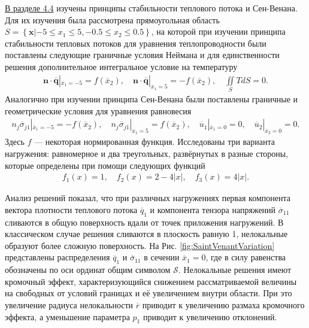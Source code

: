 \underline{В разделе 4.4} изучены принципы стабильности теплового потока и Сен-Венана. Для их изучения была рассмотрена прямоугольная область $S = \left\{ \boldsymbol{x} | -5 \leqslant x_1 \leqslant 5, -0.5 \leqslant x_2 \leqslant 0.5 \right\}$, на которой при изучении принципа стабильности тепловых потоков для уравнения теплопроводности были поставлены следующие граничные условия Неймана и для единственности решения дополнительное интегральное условие на температуру
\begin{gather*}
	\boldsymbol{n} \cdot \overline{\boldsymbol{q}} |_{\overline{x}_1 = -5} = f(\overline{x}_2),
	\quad
	\boldsymbol{n} \cdot \overline{\boldsymbol{q}} |_{\overline{x}_1 = 5} = -f(\overline{x}_2),
	\quad
	\iint\limits_S T dS = 0.
\end{gather*}
Аналогично при изучении принципа Сен-Венана были поставлены граничные и геометрические условия для уравнения равновесия
\begin{gather*}
	n_j \overline{\sigma}_{j1} |_{\overline{x}_1 = -5} = -f(\overline{x}_2),
	\quad
	n_j \overline{\sigma}_{j1} |_{\overline{x}_1 = 5} = f(\overline{x}_2),
	\quad
	\overline{u}_1 |_{\overline{x}_1 = 0} = 0,
	\quad
	\overline{u}_2 |_{\overline{x}_2 = 0} = 0.
\end{gather*}
Здесь $f$ --- некоторая нормированная функция. Исследованы три варианта нагружения: равномерное и два треугольных, развёрнутых в разные стороны, которые определены при помощи следующих функций
\begin{gather*}
	f_1 (x) = 1,
	\quad
	f_2 (x) = 2 - 4 |x|,
	\quad
	f_3 (x) = 4 |x|.
\end{gather*}

Анализ решений показал, что при различных нагружениях первая компонента вектора плотности теплового потока $\overline{q}_1$ и компонента тензора напряжений $\overline{\sigma}_{11}$ сливаются в общую поверхность вдали от точек приложения нагружений. В классическом случае решения сливаются в плоскость равную 1, нелокальные образуют более сложную поверхность. На Рис. \ref{fig:SaintVenantVariation} представлены распределения $\overline{q}_1$ и $\overline{\sigma}_{11}$ в сечении $\overline{x}_1 = 0$, где в силу равенства обозначены по оси ординат общим символом $\mathcal{S}$. Нелокальные решения имеют кромочный эффект, характеризующийся снижением рассматриваемой величины на свободных от условий границах и её увеличением внутри области. При это увеличение радиуса нелокальности $\overline{r}$ приводит к увеличению размаха кромочного эффекта, а уменьшение параметра $p_1$ приводит к увеличению отклонений.


